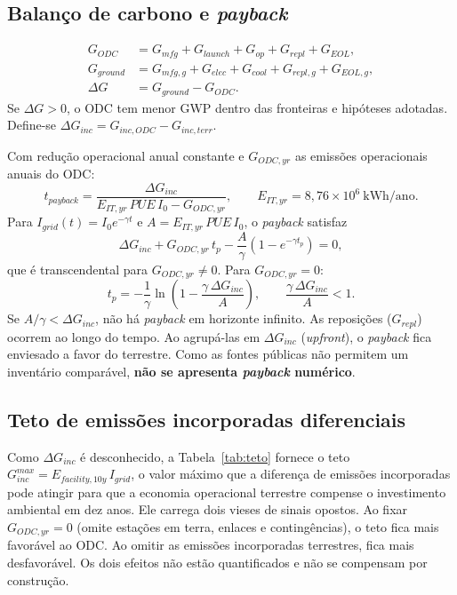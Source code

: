\documentclass[11pt,a4paper]{article}
\begin{document}
\subsection{Balanço de carbono e \emph{payback}}
\begin{align}
  G_{ODC}&=G_{mfg}+G_{launch}+G_{op}+G_{repl}+G_{EOL},\nonumber\\
  G_{ground}&=G_{mfg,g}+G_{elec}+G_{cool}+G_{repl,g}+G_{EOL,g},
  \label{eq:bal}\\
  \Delta G&=G_{ground}-G_{ODC}.
  \label{eq:dg}
\end{align}
Se $\Delta G>0$, o ODC tem menor GWP dentro das fronteiras e hipóteses
adotadas. Define-se $\Delta G_{inc}=G_{inc,ODC}-G_{inc,terr}$.

Com redução operacional anual constante e $G_{ODC,yr}$ as emissões
operacionais anuais do ODC:
\begin{equation}
  t_{payback}=\frac{\Delta G_{inc}}{E_{IT,yr}\,PUE\,I_0-G_{ODC,yr}},\qquad
  E_{IT,yr}=8{,}76\times10^{6}~\text{kWh/ano}.
  \label{eq:payback}
\end{equation}
Para $I_{grid}(t)=I_0e^{-\gamma t}$ e $A=E_{IT,yr}\,PUE\,I_0$, o \emph{payback}
satisfaz
\begin{equation}
  \Delta G_{inc}+G_{ODC,yr}\,t_p-\frac{A}{\gamma}\left(1-e^{-\gamma t_p}\right)=0,
  \label{eq:paybackexp}
\end{equation}
que é transcendental para $G_{ODC,yr}\neq0$. Para $G_{ODC,yr}=0$:
\begin{equation}
  t_p=-\frac{1}{\gamma}\ln\!\left(1-\frac{\gamma\,\Delta G_{inc}}{A}\right),
  \qquad \frac{\gamma\,\Delta G_{inc}}{A}<1.
  \label{eq:paybackclosed}
\end{equation}
Se $A/\gamma<\Delta G_{inc}$, não há \emph{payback} em horizonte infinito. As
reposições ($G_{repl}$) ocorrem ao longo do tempo. Ao agrupá-las em
$\Delta G_{inc}$ (\emph{upfront}), o \emph{payback} fica enviesado a favor do
terrestre. Como as fontes públicas não permitem um inventário comparável,
\textbf{não se apresenta \emph{payback} numérico}.

\subsection{Teto de emissões incorporadas diferenciais}\label{sec:teto}

Como $\Delta G_{inc}$ é desconhecido, a Tabela~\ref{tab:teto} fornece o teto
$G_{inc}^{max}=E_{facility,10y}\,I_{grid}$, o valor máximo que a diferença de
emissões incorporadas pode atingir para que a economia operacional terrestre
compense o investimento ambiental em dez anos. Ele carrega dois vieses de
sinais opostos. Ao fixar $G_{ODC,yr}=0$ (omite estações em terra, enlaces e
contingências), o teto fica mais favorável ao ODC. Ao omitir as emissões
incorporadas terrestres, fica mais desfavorável. Os dois efeitos não estão
quantificados e não se compensam por construção.
\end{document}
